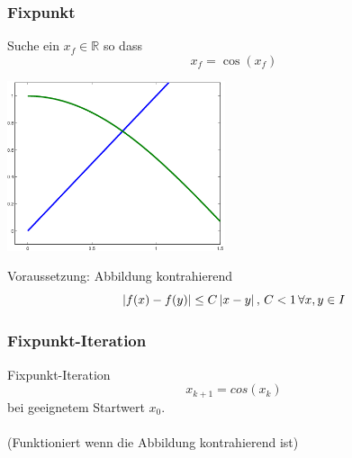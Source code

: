 \documentclass[hyperref={xetex}]{beamer}
\begin{document}
%
%
\begin{frame}[fragile]\frametitle{Fixpunkt}
Suche ein $x_f \in \mathbb{R}$ so dass
\[ x_f = \cos (x_f ) \]
\begin{center}
\includegraphics[height=5cm]{figures/fixpunkt}
\end{center}
Voraussetzung: Abbildung kontrahierend 
\[
\left\lvert f(x)-f(y)\right\rvert \leq C \left\lvert x-y\right\rvert,\, C < 1\,  \forall  x,y \in  I
\]

\end{frame}
%
%
\begin{frame}[fragile]\frametitle{Fixpunkt-Iteration}
Fixpunkt-Iteration 
\[ x_{k+1}=cos(x_k) \]
bei geeignetem Startwert $x_0$.  \\
\\
(Funktioniert wenn die Abbildung kontrahierend ist)
\end{frame}
\end{document}
